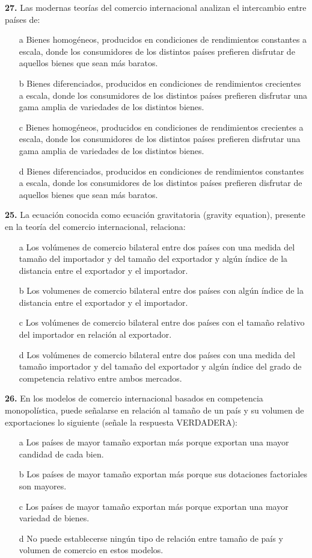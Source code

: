 \documentclass{nuevotema}
\begin{document}
\textbf{27.} Las modernas teorías del comercio internacional analizan el intercambio entre países de:
\begin{itemize}
	\item[a] Bienes homogéneos, producidos en condiciones de rendimientos constantes a escala, donde los consumidores de los distintos países prefieren disfrutar de aquellos bienes que sean más baratos. 
	\item[b] Bienes diferenciados, producidos en condiciones de rendimientos crecientes a escala, donde los consumidores de los distintos países prefieren disfrutar una gama amplia de variedades de los distintos bienes.
	\item[c] Bienes homogéneos, producidos en condiciones de rendimientos crecientes a escala, donde los consumidores de los distintos países prefieren disfrutar una gama amplia de variedades de los distintos bienes.
	\item[d] Bienes diferenciados, producidos en condiciones de rendimientos constantes a escala, donde los consumidores de los distintos países prefieren disfrutar de aquellos bienes que sean más baratos.
\end{itemize}

\textbf{25.} La ecuación conocida como ecuación gravitatoria (gravity equation), presente en la teoría del comercio internacional, relaciona:
\begin{itemize}
	\item[a] Los volúmenes de comercio bilateral entre dos países con una medida del tamaño del importador y del tamaño del exportador y algún índice de la distancia entre el exportador y el importador.
	\item[b] Los volumenes de comercio bilateral entre dos países con algún índice de la distancia entre el exportador y el importador.
	\item[c] Los volúmenes de comercio bilateral entre dos países con el tamaño relativo del importador en relación al exportador.
	\item[d] Los volúmenes de comercio bilateral entre dos países con una medida del tamaño importador y del tamaño del exportador y algún índice del grado de competencia relativo entre ambos mercados.
\end{itemize}

\textbf{26.} En los modelos de comercio internacional basados en competencia monopolística, puede señalarse en relación al tamaño de un país y su volumen de exportaciones lo siguiente (señale la respuesta VERDADERA):
\begin{itemize}
	\item[a] Los países de mayor tamaño exportan más porque exportan una mayor candidad de cada bien.
	\item[b] Los países de mayor tamaño exportan más porque sus dotaciones factoriales son mayores.
	\item[c] Los países de mayor tamaño exportan más porque exportan una mayor variedad de bienes.
	\item[d] No puede establecerse ningún tipo de relación entre tamaño de país y volumen de comercio en estos modelos.
\end{itemize}
\end{document}
